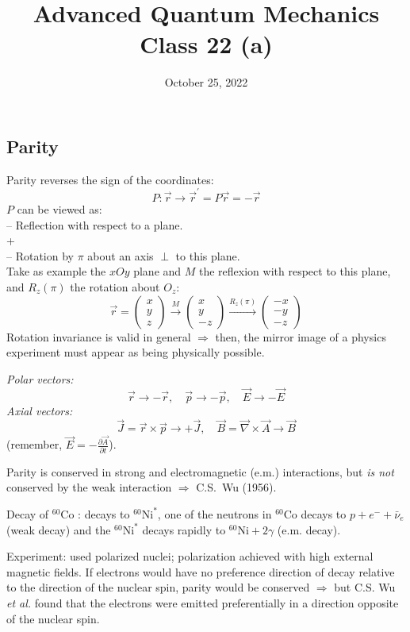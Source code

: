 \documentclass[12pt]{article}
\title{Advanced Quantum Mechanics\\Class 22 (a)}
\date{October 25, 2022}                                           %
\newcommand{\be}{\begin{equation}}
\newcommand{\ee}{\end{equation}}
\begin{document}
\maketitle


\subsection{Parity}

Parity reverses the sign of the coordinates:
\be
P: \vec{r} \to \vec{r}^\prime = P\vec{r} = -\vec{r}
\ee
$P$ can be viewed as:\\
 -- Reflection with respect to a plane.\\
 \phantom{ -- Reflection with}+\\
 -- Rotation by $\pi$ about an axis $\perp$ to this plane.\\
Take as example the $xOy$ plane and $M$ the reflexion 
with respect to this plane, and $R_z(\pi)$ the rotation
about $O_z$:
\be
\vec{r} = \begin{pmatrix}x\\y\\z\end{pmatrix}
\stackrel{M}{\longrightarrow} \begin{pmatrix}x\\y\\-z\end{pmatrix}
\stackrel{R_z(\pi)}{\longrightarrow} \begin{pmatrix}-x\\-y\\-z\end{pmatrix}
\ee
Rotation invariance is valid in general
$\Rightarrow$
then, the mirror image of a physics experiment
must appear as being physically possible.

\emph{Polar vectors:}
\be
\vec{r}\to-\vec{r}, \quad \vec{p}\to-\vec{p}, \quad \vec{E}\to-\vec{E}
\ee
\emph{Axial vectors:}
\be
\vec{J} = \vec{r} \times \vec{p} \to +\vec{J}, \quad \vec{B} = \vec{\nabla} \times \vec{A} \to \vec{B}
\ee
(remember, $\vec{E} = - \frac{\partial \vec{A}}{\partial t}$).


Parity is conserved in strong and electromagnetic (e.m.)
interactions, but \emph{is not} conserved by the weak interaction
$\Rightarrow$ C.S.~Wu (1956).

\begin{displayquote}
Decay of ${ }^{60} \mathrm{Co}$ : decays to ${ }^{60} \mathrm{Ni}^{*}$, one of the neutrons
in ${ }^{60} \mathrm{Co}$ decays to $p+e^{-}+\bar{\nu}_{e}$ (weak decay) and the
${ }^{60} \mathrm{Ni}^{*}$ decays rapidly to ${ }^{60} \mathrm{Ni}+2 \gamma$ (e.m. decay).

Experiment: used polarized nuclei; polarization
achieved with high external magnetic fields.
If electrons would have no preference direction of
decay relative to the direction of the nuclear spin,
parity would be conserved
$\Rightarrow$
but C.S. Wu \textit{et al.} found that
the electrons were emitted preferentially
in a direction opposite of the
nuclear spin.
\end{displayquote}
\end{document}
